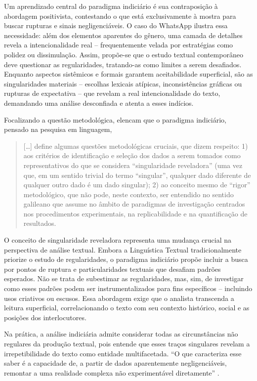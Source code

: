 \documentclass[portuguese]{textolivre}
\begin{document}
Um aprendizado central do paradigma indiciário é sua contraposição à abordagem positivista, contestando o que está exclusivamente à mostra para buscar rupturas e sinais negligenciáveis. O caso do WhatsApp ilustra essa necessidade: além dos elementos aparentes do gênero, uma camada de detalhes revela a intencionalidade real – frequentemente velada por estratégias como polidez ou dissimulação. Assim, propõe-se que o estudo textual contemporâneo deve questionar as regularidades, tratando-as como limites a serem desafiados. Enquanto aspectos sistêmicos e formais garantem aceitabilidade superficial, são as singularidades materiais – escolhas lexicais atípicas, inconsistências gráficas ou rupturas de expectativa – que revelam a real intencionalidade do texto, demandando uma análise desconfiada e atenta a esses indícios.

Focalizando a questão metodológica, \textcite[p. 174]{abaurre2008torno} elencam que o paradigma indiciário, pensado na pesquisa em linguagem,

\begin{quote}
    […] define algumas questões metodológicas cruciais, que dizem respeito: 1) aos critérios de identificação e seleção dos dados a serem tomados como representativos do que se considera “singularidade reveladora” (uma vez que, em um sentido trivial do termo “singular”, qualquer dado diferente de qualquer outro dado é um dado singular); 2) ao conceito mesmo de “rigor” metodológico, que não pode, neste contexto, ser entendido no sentido galileano que assume no âmbito de paradigmas de investigação centrados nos procedimentos experimentais, na replicabilidade e na quantificação de resultados.
\end{quote}

O conceito de singularidade reveladora representa uma mudança crucial na perspectiva de análise textual. Embora a Linguística Textual tradicionalmente priorize o estudo de regularidades, o paradigma indiciário propõe incluir a busca por pontos de ruptura e particularidades textuais que desafiam padrões esperados. Não se trata de subestimar as regularidades, mas, sim, de investigar como esses padrões podem ser instrumentalizados para fins específicos – incluindo usos criativos ou escusos. Essa abordagem exige que o analista transcenda a leitura superficial, correlacionando o texto com seu contexto histórico, social e as posições dos interlocutores.

Na prática, a análise indiciária admite considerar todas as circunstâncias não regulares da produção textual, pois entende que esses traços singulares revelam a irrepetibilidade do texto como entidade multifacetada. “O que caracteriza esse saber é a capacidade de, a partir de dados aparentemente negligenciáveis, remontar a uma realidade complexa não experimentável diretamente” \cite[p. 152]{ginzburg1986mitos}.
\end{document}
